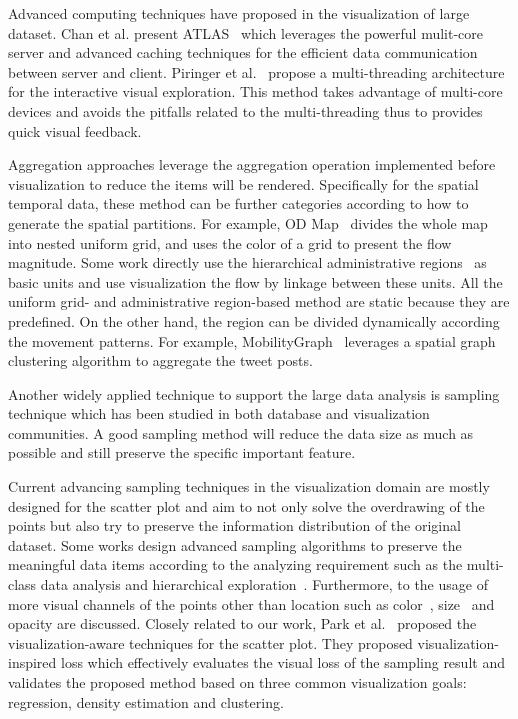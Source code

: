 Advanced computing techniques have proposed in the visualization of large dataset. Chan et al. present ATLAS~\cite{chan2008maintaining} which leverages the powerful mulit-core server and advanced caching techniques for the efficient data communication between server and client.  Piringer et al.~\cite{piringer2009multi} propose a multi-threading architecture for the interactive visual exploration. This method takes advantage of multi-core devices and avoids the pitfalls related to the multi-threading thus to provides quick visual feedback.

Aggregation approaches leverage the aggregation operation implemented before visualization to reduce the items will be rendered. Specifically for the spatial temporal data, these method can be further categories according to how to generate the spatial partitions. For example, OD Map~\cite{wood2010visualisation} divides the whole map into nested uniform grid, and uses the color of a grid to present the flow magnitude.
Some work directly use the hierarchical administrative regions~\cite{guo2009flow} as basic units and use visualization the flow by linkage between these units. All the uniform grid- and administrative region-based method are static because they are predefined. On the other hand, the region can be divided dynamically according the movement patterns. For example, MobilityGraph~\cite{von2015mobilitygraphs} leverages a spatial graph clustering algorithm to aggregate the tweet posts.



Another widely applied technique to support the large data analysis is sampling technique which has been studied in both database and visualization communities. A good sampling method will reduce the data size as much as possible and still preserve the specific important feature.

Current advancing sampling techniques in the visualization domain are mostly designed for the scatter plot and aim to not only solve the overdrawing of the points but also try to preserve the information distribution of the original dataset.
Some works design advanced sampling algorithms to preserve the meaningful data items according to the analyzing requirement such as the multi-class data analysis and hierarchical exploration~\cite{chen2014visual}. Furthermore, to the usage of more visual channels of the points other than location such as color~\cite{chen2014visual}, size~\cite{woodruff1998constant} and opacity are discussed.
Closely related to our work, Park et al.~\cite{park2016visualization} proposed the visualization-aware techniques for the scatter plot. They proposed visualization-inspired loss which effectively evaluates the visual loss of the sampling result and validates the proposed method based on three common visualization goals:  regression, density estimation and clustering.

